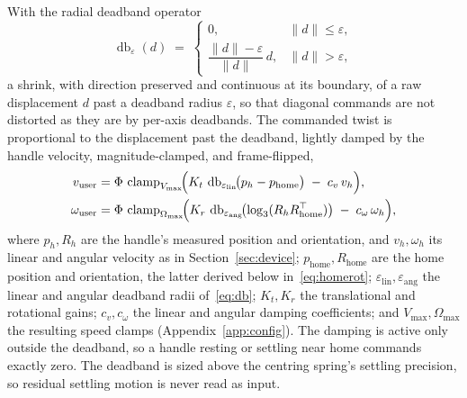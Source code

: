 \documentclass[12pt,a4paper,twoside,openright]{report}
\begin{document}
With the radial deadband operator
\begin{equation}
\operatorname{db}_{\varepsilon}(d) \;=\;
\begin{cases}
0, & \|d\| \le \varepsilon,\\[2pt]
\dfrac{\|d\|-\varepsilon}{\|d\|}\, d, & \|d\| > \varepsilon,
\end{cases}
\label{eq:db}
\end{equation}
a shrink, with direction preserved and continuous at its boundary, of a raw displacement $d$ past a deadband radius $\varepsilon$, so that diagonal commands are not distorted as they are by per-axis deadbands. The commanded twist is proportional to the displacement past the deadband, lightly damped by the handle velocity, magnitude-clamped, and frame-flipped,
\begin{equation}
\begin{aligned}
v_{\text{user}} &= \Phi\,\operatorname{clamp}_{V_{\max}}\!\Bigl(K_t\,\operatorname{db}_{\varepsilon_{\text{lin}}}\!\bigl(p_h - p_{\text{home}}\bigr) \;-\; c_v\, v_h\Bigr),\\
\omega_{\text{user}} &= \Phi\,\operatorname{clamp}_{\Omega_{\max}}\!\Bigl(K_r\,\operatorname{db}_{\varepsilon_{\text{ang}}}\!\bigl(\log_3(R_h R_{\text{home}}^{\top})\bigr) \;-\; c_\omega\, \omega_h\Bigr),
\end{aligned}
\label{eq:jtwist}
\end{equation}
where $p_h, R_h$ are the handle's measured position and orientation, and $v_h, \omega_h$ its linear and angular velocity as in Section~\ref{sec:device}; $p_{\text{home}}, R_{\text{home}}$ are the home position and orientation, the latter derived below in~\eqref{eq:homerot}; $\varepsilon_{\text{lin}}, \varepsilon_{\text{ang}}$ the linear and angular deadband radii of~\eqref{eq:db}; $K_t, K_r$ the translational and rotational gains; $c_v, c_\omega$ the linear and angular damping coefficients; and $V_{\max}, \Omega_{\max}$ the resulting speed clamps (Appendix~\ref{app:config}). The damping is active only outside the deadband, so a handle resting or settling near home commands exactly zero. The deadband is sized above the centring spring's settling precision, so residual settling motion is never read as input.
\end{document}
